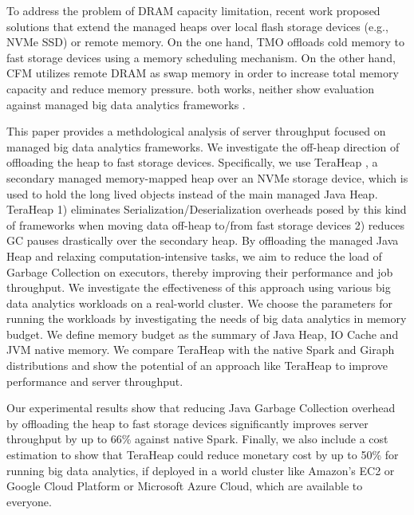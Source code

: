 To address the problem of DRAM capacity limitation, recent work
proposed solutions that extend the managed heaps over local flash
storage devices (e.g., NVMe SSD) or remote memory. On the one hand,
TMO \cite{TMO} offloads cold memory to fast storage devices using
a memory scheduling mechanism. On the other hand, CFM \cite{CFM}
utilizes remote DRAM as swap memory in order to increase total memory capacity
and reduce memory pressure. \noteOf both works, neither show
evaluation against managed big data analytics frameworks .

This paper provides a methdological analysis of server throughput 
focused on managed big data analytics frameworks.
We investigate the off-heap direction of offloading the heap
to fast storage devices.
Specifically, we use TeraHeap \cite{TeraHeap}, a secondary managed
memory-mapped heap over an NVMe storage device, which is used to hold
the long lived objects instead of the main managed Java Heap. TeraHeap
1) eliminates Serialization/Deserialization overheads posed by this
kind of frameworks when moving data off-heap to/from fast storage
devices 2) reduces GC pauses drastically over the secondary heap. By
offloading the managed Java Heap and relaxing computation-intensive
tasks, we aim to reduce the load of Garbage Collection on executors,
thereby improving their performance and job throughput. We investigate
the effectiveness of this approach using various big
data analytics workloads on a real-world cluster. We choose the
parameters for running the workloads by investigating the needs of big
data analytics in memory budget. We define memory budget as
the summary of Java Heap, IO Cache and JVM native memory. We compare
TeraHeap with the native Spark and Giraph distributions and show the potential of
an approach like TeraHeap to improve performance and server throughput.

Our experimental results show that reducing Java Garbage Collection
overhead by offloading the heap to fast storage devices significantly
improves server throughput by up to 66\% against native Spark. 
Finally, we also include a cost estimation to show that
TeraHeap could reduce monetary cost by up to 50\% for running big data
analytics, if deployed in a world cluster like Amazon's EC2 or Google
Cloud Platform or Microsoft Azure Cloud, which are available to
everyone.

